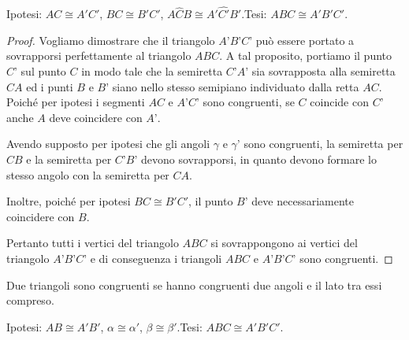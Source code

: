 \noindent Ipotesi: $AC\cong A'C'$, $BC\cong B'C'$, $A\widehat{C}B \cong A'\widehat{C'}B'$.\tab Tesi:  $ABC \cong A'B'C'$.

\begin{proof}
Vogliamo dimostrare che il triangolo $A’B’C’$ può essere portato a sovrapporsi perfettamente al triangolo $ABC$.
A tal proposito, portiamo il punto $C’$ sul punto $C$ in modo tale che la semiretta $C’A’$ sia sovrapposta alla semiretta $CA$ ed i punti $B$ e $B’$ siano nello stesso semipiano individuato dalla retta $AC$.
Poiché per ipotesi i segmenti $AC$ e $A’C’$ sono congruenti, se $C$ coincide con $C’$ anche $A$ deve coincidere con $A’$.

Avendo supposto per ipotesi che gli angoli $\gamma$ e $\gamma’$ sono congruenti, la semiretta per $CB$ e la semiretta per $C’B’$ devono sovrapporsi, in quanto devono formare lo stesso angolo con la semiretta per $CA$.

Inoltre, poiché per ipotesi $BC\cong B'C'$, il punto $B’$ deve necessariamente coincidere con $B$.

Pertanto tutti i vertici del triangolo $ABC$ si sovrappongono ai vertici del triangolo $A’B’C’$ e di conseguenza i triangoli $ABC$ e $A’B’C’$ sono congruenti.
\end{proof}

\begin{teorema}
Due triangoli sono congruenti se hanno congruenti due angoli e il lato tra essi compreso.
\end{teorema}

\begin{figure}[htb]
\centering
\end{figure}

\noindent Ipotesi: $AB\cong A'B'$, $\alpha\cong \alpha'$, $\beta \cong \beta'$.\tab Tesi:  $ABC \cong A'B'C'$.

